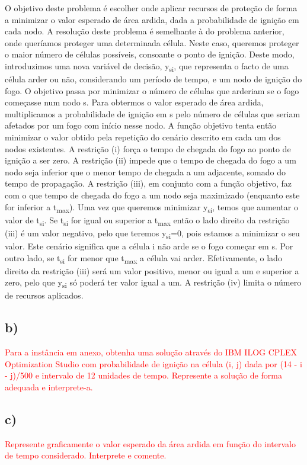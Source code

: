 \documentclass[11pt]{article} %
\begin{document}
O objetivo deste problema é escolher onde aplicar recursos de proteção de forma a minimizar o valor esperado de área ardida, dada a probabilidade de ignição em cada nodo. A resolução deste problema é semelhante à do problema anterior, onde queríamos proteger uma determinada célula. Neste caso, queremos proteger o maior número de células possíveis, consoante o ponto de ignição. Deste modo, introduzimos uma nova variável de decisão, y\textsubscript{si}, que representa o facto de uma célula arder ou não, considerando um período de tempo, e um nodo de ignição do fogo. O objetivo passa por minimizar  o número de células que arderiam se o fogo começasse num nodo s. 
Para obtermos o valor esperado de área ardida, multiplicamos a probabilidade de ignição em s pelo número de células que seriam afetados por um fogo com início nesse nodo. A função objetivo tenta então minimizar o valor obtido pela repetição do cenário descrito em cada um dos nodos existentes. A restrição (i) força o tempo de chegada do fogo ao ponto de ignição a ser zero. A restrição (ii) impede que o tempo de chegada do fogo a um nodo seja inferior que o menor tempo de chegada a um adjacente, somado do tempo de propagação. A restrição (iii), em conjunto com a função objetivo, faz com o que tempo de chegada do fogo a um nodo seja maximizado (enquanto este for inferior a t\textsubscript{max}). Uma vez que queremos minimizar y\textsubscript{si}, temos que aumentar o valor de t\textsubscript{si}. Se  t\textsubscript{si} for igual ou superior a t\textsubscript{max} então o lado direito da restrição (iii) é um valor negativo, pelo que teremos y\textsubscript{si}=0, pois estamos a minimizar o seu valor. Este cenário significa que a célula i não arde se o fogo começar em s. Por outro lado, se t\textsubscript{si} for menor que  t\textsubscript{max} a célula vai arder. Efetivamente, o lado direito da restrição (iii) será um valor positivo, menor ou igual a um e superior a zero, pelo que y\textsubscript{si} só poderá ter valor igual a um. A restrição (iv) limita o número de recursos aplicados. 
\subsection*{b)}
\textcolor{red}{Para a instância em anexo, obtenha uma solução através do IBM ILOG CPLEX
Optimization Studio com probabilidade de ignição na célula (i, j) dada por (14 - i -
j)/500 e intervalo de 12 unidades de tempo. Represente a solução de forma adequada
e interprete-a.}

\subsection*{c)}
\textcolor{red}{Represente graficamente o valor esperado da área ardida em função do intervalo
de tempo considerado. Interprete e comente.}
\end{document}
